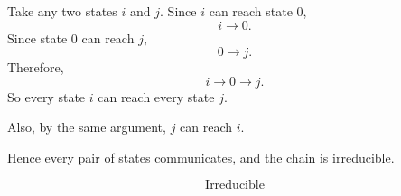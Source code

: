 \documentclass[12pt,a4paper]{article}
\theoremstyle{notestyle}
\begin{document}
Take any two states $i$ and $j$. Since $i$ can reach state $0$,
\[
i\to 0.
\]
Since state $0$ can reach $j$,
\[
0\to j.
\]
Therefore,
\[
i\to 0\to j.
\]
So every state $i$ can reach every state $j$.

Also, by the same argument, $j$ can reach $i$.

Hence every pair of states communicates, and the chain is irreducible.

\[
\boxed{\text{Irreducible}}
\]
\end{document}
